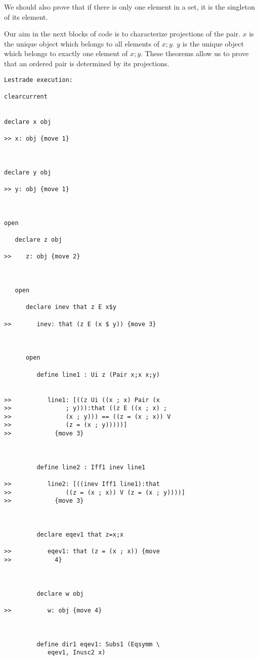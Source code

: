 \documentclass[12pt]{article}
\begin{document}
We should also prove that if there is only one element in a set, it is the singleton of its element.

Our aim in the next blocks of code is to characterize projections of the pair.  $x$ is the unique object which belongs to all elements of $x;y$.  $y$ is the unique object which belongs to exactly one element of $x;y$.  These theorems allow us to prove that an ordered pair is determined by its projections.

\begin{verbatim}Lestrade execution:

clearcurrent


declare x obj

>> x: obj {move 1}



declare y obj

>> y: obj {move 1}



open

   declare z obj

>>    z: obj {move 2}



   open

      declare inev that z E x$y

>>       inev: that (z E (x $ y)) {move 3}



      open

         define line1 : Ui z (Pair x;x x;y)


>>          line1: [((z Ui ((x ; x) Pair (x
>>               ; y))):that ((z E ((x ; x) ;
>>               (x ; y))) == ((z = (x ; x)) V
>>               (z = (x ; y)))))]
>>            {move 3}



         define line2 : Iff1 inev line1

>>          line2: [((inev Iff1 line1):that
>>               ((z = (x ; x)) V (z = (x ; y))))]
>>            {move 3}



         declare eqev1 that z=x;x

>>          eqev1: that (z = (x ; x)) {move
>>            4}



         declare w obj

>>          w: obj {move 4}



         define dir1 eqev1: Subs1 (Eqsymm \
            eqev1, Inusc2 x)


\end{verbatim}
\end{document}
